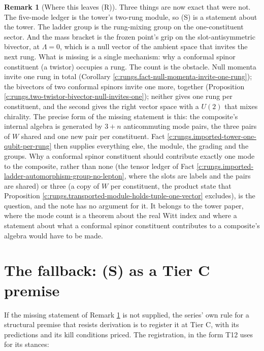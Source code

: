 \documentclass[11pt]{article}
\theoremstyle{definition}
\newtheorem{remark}[theorem]{Remark}
\theoremstyle{plain}
\begin{document}
\begin{remark}[Where this leaves (R)]\label{c:note.rungs.where-leaves-r}
Three things are now exact that were not. The five-mode ledger is the tower's two-rung module, so (S) is a statement about the tower. The ladder group is the rung-mixing group on the one-constituent sector. And the mass bracket is the frozen point's grip on the slot-antisymmetric bivector, at $\Lambda = 0$, which is a null vector of the ambient space that invites the next rung. What is missing is a single mechanism: why a conformal spinor constituent (a twistor) occupies a rung. The count is the obstacle. Null momenta invite one rung in total (Corollary \ref{c:rungs.fact-null-momenta-invite-one-rung}); the bivectors of two conformal spinors invite one more, together (Proposition \ref{c:rungs.two-twistor-bivector-null-invites-one}); neither gives one rung per constituent, and the second gives the right vector space with a $U(2)$ that mixes chirality. The precise form of the missing statement is this: the composite's internal algebra is generated by $3 + n$ anticommuting mode pairs, the three pairs of $W$ shared and one new pair per constituent. Fact \ref{c:rungs.imported-tower-one-qubit-per-rung} then supplies everything else, the module, the grading and the groups. Why a conformal spinor constituent should contribute exactly one mode to the composite, rather than none (the tensor ledger of Fact \ref{c:rungs.imported-ladder-automorphism-group-no-lepton}, where the slots are labels and the pairs are shared) or three (a copy of $W$ per constituent, the product state that Proposition \ref{c:rungs.transported-module-holds-tuple-one-vector} excludes), is the question, and the note has no argument for it. It belongs to the tower paper, where the mode count is a theorem about the real Witt index and where a statement about what a conformal spinor constituent contributes to a composite's algebra would have to be made.
\end{remark}

\section{The fallback: (S) as a Tier C premise}

\label{c:note.rungs.setting-fallback-s-tier-c-premise}
If the missing statement of Remark \ref{c:note.rungs.where-leaves-r} is not supplied, the series' own rule for a structural premise that resists derivation is to register it at Tier C, with its predictions and its kill conditions priced. The registration, in the form T12 uses for its stances:
\end{document}
